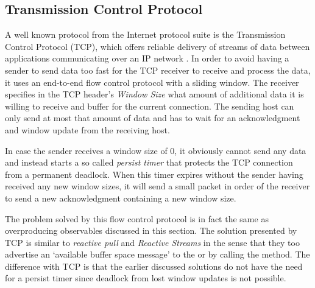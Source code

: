 \subsection{Transmission Control Protocol}
\label{subsec:tcp}
A well known protocol from the Internet protocol suite is the Transmission Control Protocol (TCP), which offers reliable delivery of streams of data between applications communicating over an IP network \cite{tanenbaum2011-Computer-Networks}. In order to avoid having a sender to send data too fast for the TCP receiver to receive and process the data, it uses an end-to-end flow control protocol with a sliding window. The receiver specifies in the TCP header's \textit{Window Size} what amount of additional data it is willing to receive and buffer for the current connection. The sending host can only send at most that amount of data and has to wait for an acknowledgment and window update from the receiving host.

In case the sender receives a window size of 0, it obviously cannot send any data and instead starts a so called \textit{persist timer} that protects the TCP connection from a permanent deadlock. When this timer expires without the sender having received any new window sizes, it will send a small packet in order of the receiver to send a new acknowledgment containing a new window size.

The problem solved by this flow control protocol is in fact the same as overproducing observables discussed in this section. The solution presented by TCP is similar to \textit{reactive pull} and \textit{Reactive Streams} in the sense that they too advertise an `available buffer space message' to the  or \obs by calling the  method. The difference with TCP is that the earlier discussed solutions do not have the need for a persist timer since deadlock from lost window updates is not possible.
